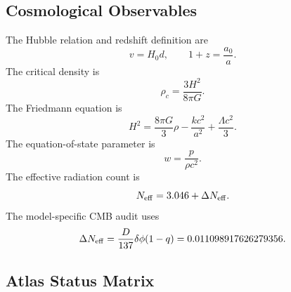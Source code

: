 \documentclass[11pt]{article}
\begin{document}
\subsection{Cosmological Observables}

The Hubble relation and redshift definition are
\begin{equation}
    v=H_0d,\qquad
    1+z=\frac{a_0}{a}.
\end{equation}
The critical density is
\begin{equation}
    \rho_c=\frac{3H^2}{8\pi G}.
\end{equation}
The Friedmann equation is
\begin{equation}
    H^2=\frac{8\pi G}{3}\rho-\frac{kc^2}{a^2}
    +\frac{\Lambda c^2}{3}.
\end{equation}
The equation-of-state parameter is
\begin{equation}
    w=\frac{p}{\rho c^2}.
\end{equation}
The effective radiation count is
\begin{equation}
    N_{\rm eff}=3.046+\Delta N_{\rm eff}.
\end{equation}
The model-specific CMB audit uses
\begin{equation}
    \Delta N_{\rm eff}
    =
    \frac{D}{137}\delta\phi(1-q)
    =
    0.011098917626279356.
\end{equation}

\subsection{Atlas Status Matrix}
\end{document}
